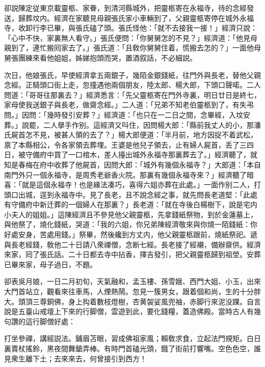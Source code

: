 卻説陳定従東京載靈柩、家眷，到清河縣城外，把靈柩寄在永福寺，待的念經發送，歸葬坟内。經濟在家聽見母親張氏家小車輛到了，父親靈柩寄停在城外永福寺，收卸行李已畢，與張氏磕了頭。張氏怪他：「就不去接我一接！」經濟只說：「心中不快，家裏無人看守。」張氏便問：「你舅舅怎的不見？」經濟道：「他見母親到了，連忙搬囘家去了。」張氏道：「且敎你舅舅住着，慌搬去怎的？」一面他母舅張團練來看他姐姐，姊娣抱頭而哭，置酒叙話，不必細説。

次日，他娘張氏，早使經濟拿五兩銀子，幾陌金銀錢紙，往門外與長老，替他父親念經。正騎頭口街上走，忽撞遇他兩個朋友，陸太郎、楊大郎，下頭口聲喏。二人問道：「哥哥往那裏去？」經濟悉言：「先父靈柩寄在門外寺裏，明日廿日是終七，家母使我送銀子與長老，做齋念經。」二人道：「兄弟不知老伯靈柩到了，有失弔問。」因問：「幾時發引安葬？」經濟道：「也只在一二日之間，念畢經，入坟安葬。」說罷，二人擧手作别。這經濟又呌住，因問楊大郎：「縣前我丈人的小，那潘氏屍首怎不見，被甚人領的去了？」楊大郎便道：「半月前，地方因捉不着武松，禀了本縣相公，令各家領去葬埋。王婆是他兒子領去，止有婦人屍首，丢了三四日，被守備府中買了一口棺木，差人擡出城外永福寺那裏葬去了。」經濟聽了，就知是春梅在府中收葬了他屍首，因問大郎：「城外有幾個永福寺？」大郎道：「本自南門外只一個永福寺，是周秀老爺香火院。那裏有幾個永福寺來？」經濟聽了暗喜：「就是這個永福寺！也是緣法凑巧，喜得六姐亦葬在此處。」一面作别二人，打頭口出城，逕到永福寺中。見了長老，且不說念經之事，就先問長老道堅：「此處有守備府中新迁葬的一個婦人在那裏？」長老道：「就在寺後白楊樹下，說是宅内小夫人的姐姐。」這陳經濟且不參見他父親靈柩，先拿錢紙祭物，到於金蓮墓上，與他祭了，燒化錢紙，哭道：「我的六姐，你兄弟陳經濟敬來與你燒一陌錢紙：你好處安身，苦處用錢。」祭畢，然後纔到方丈内，他父親靈柩跟前，燒紙祭祀。遞與長老經錢，敎他二十日請八衆禪僧，念断七經。長老接了經襯，備辦齋供。經濟來家，囘了張氏話。二十日都去寺中拈香，擇吉發引，把父親靈柩歸到祖塋。安葬已畢來家，母子過日，不題。

卻表吳月娘，一日二月初旬，天氣融和，孟玉樓、孫雪娥、西門大姐、小玉，出來大門首站立，觀看來往車馬，人煙熱鬧。忽見一簇男女，跟着個和尚，生的十分胖大。頭頂三尊銅佛，身上抅着數枝燈樹，杏黄袈娑風兜袖，赤脚行來泥没踝。自言說是五臺山戒壇上下來的行脚僧，雲遊到此，要化錢糧，蓋造佛殿。當時古人有幾句讚的這行脚僧好處：

\begin{myquote}
打坐參禪，講經説法。鋪眉苫眼，習成佛祖家風；賴敎求食，立起法門規矩。白日裏賣杖搖鈴，黑夜間舞鎗弄棒。有時門首磕光頭，餓了街前打響嘴。空色色空，誰見衆生離下土；去來來去，何曾接引到西方！
\end{myquote}

